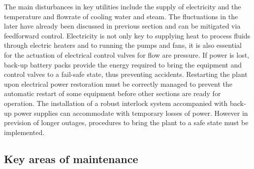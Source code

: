 The main disturbances in key utilities include the supply of electricity and the temperature and flowrate of cooling water and steam. The fluctuations in the later have already been discussed in previous section and can be mitigated via feedforward control.
Electricity is not only key to supplying heat to process fluids through electric heaters and to running the pumps and fans, it is also essential for the actuation of electrical control valves for flow are pressure. If power is lost, back-up battery packs provide the energy required to bring the equipment and control valves to a fail-safe state, thus preventing accidents. Restarting the plant upon electrical power restoration must be correctly managed to prevent the automatic restart of some equipment before other sections are ready for operation. The installation of a robust interlock system accompanied with back-up power supplies can accommodate with temporary losses of power. However in prevision of longer outages, procedures to bring the plant to a safe state must be implemented.


\subsection{Key areas of maintenance} %


